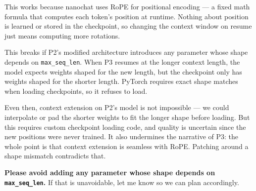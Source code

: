 \documentclass[9pt]{extarticle}
\begin{document}
This works because nanochat uses RoPE for positional encoding --- a fixed math formula that computes each token's position at runtime. Nothing about position is learned or stored in the checkpoint, so changing the context window on resume just means computing more rotations.

This breaks if P2's modified architecture introduces any parameter whose shape depends on \texttt{max\_seq\_len}. When P3 resumes at the longer context length, the model expects weights shaped for the new length, but the checkpoint only has weights shaped for the shorter length. PyTorch requires exact shape matches when loading checkpoints, so it refuses to load.

Even then, context extension on P2's model is not impossible --- we could interpolate or pad the shorter weights to fit the longer shape before loading. But this requires custom checkpoint loading code, and quality is uncertain since the new positions were never trained. It also undermines the narrative of P3: the whole point is that context extension is seamless with RoPE. Patching around a shape mismatch contradicts that.

\textbf{Please avoid adding any parameter whose shape depends on \texttt{max\_seq\_len}.} If that is unavoidable, let me know so we can plan accordingly.
\end{document}
